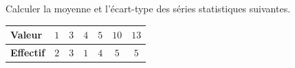 \begin{exo}
	Calculer la moyenne et l'écart-type des séries statistiques suivantes.

	\begin{center}
		\def\arraystretch{1.4}
		\begin{tabular}{|l|c|c|c|c|c|c|} \hline
			\textbf{Valeur}   & $1$ & $3$ & $4$ & $5$ & $10$ & $13$ \\ \hline
			\textbf{Effectif} & $2$ & $3$ & $1$ & $4$ & $5$  & $5$  \\ \hline
		\end{tabular}
	\end{center}
\end{exo}

